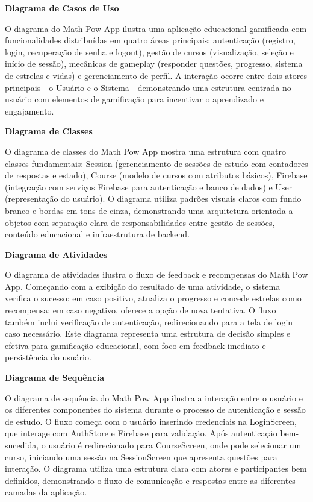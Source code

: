     \item {}

       \item \textbf{Diagrama de Casos de Uso}
       
O diagrama do Math Pow App ilustra uma aplicação educacional gamificada com funcionalidades distribuídas em quatro áreas principais: autenticação (registro, login, recuperação de senha e logout), gestão de cursos (visualização, seleção e início de sessão), mecânicas de gameplay (responder questões, progresso, sistema de estrelas e vidas) e gerenciamento de perfil. A interação ocorre entre dois atores principais - o Usuário e o Sistema - demonstrando uma estrutura centrada no usuário com elementos de gamificação para incentivar o aprendizado e engajamento.

       

\item \textbf{Diagrama de Classes}

O diagrama de classes do Math Pow App mostra uma estrutura com quatro classes fundamentais: Session (gerenciamento de sessões de estudo com contadores de respostas e estado), Course (modelo de cursos com atributos básicos), Firebase (integração com serviços Firebase para autenticação e banco de dados) e User (representação do usuário). O diagrama utiliza padrões visuais claros com fundo branco e bordas em tons de cinza, demonstrando uma arquitetura orientada a objetos com separação clara de responsabilidades entre gestão de sessões, conteúdo educacional e infraestrutura de backend.



\item \textbf{Diagrama de Atividades}

O diagrama de atividades ilustra o fluxo de feedback e recompensas do Math Pow App. Começando com a exibição do resultado de uma atividade, o sistema verifica o sucesso: em caso positivo, atualiza o progresso e concede estrelas como recompensa; em caso negativo, oferece a opção de nova tentativa. O fluxo também inclui verificação de autenticação, redirecionando para a tela de login caso necessário. Este diagrama representa uma estrutura de decisão simples e efetiva para gamificação educacional, com foco em feedback imediato e persistência do usuário.


\item \textbf{Diagrama de Sequência}

O diagrama de sequência do Math Pow App ilustra a interação entre o usuário e os diferentes componentes do sistema durante o processo de autenticação e sessão de estudo. O fluxo começa com o usuário inserindo credenciais na LoginScreen, que interage com AuthStore e Firebase para validação. Após autenticação bem-sucedida, o usuário é redirecionado para CourseScreen, onde pode selecionar um curso, iniciando uma sessão na SessionScreen que apresenta questões para interação. O diagrama utiliza uma estrutura clara com atores e participantes bem definidos, demonstrando o fluxo de comunicação e respostas entre as diferentes camadas da aplicação.


